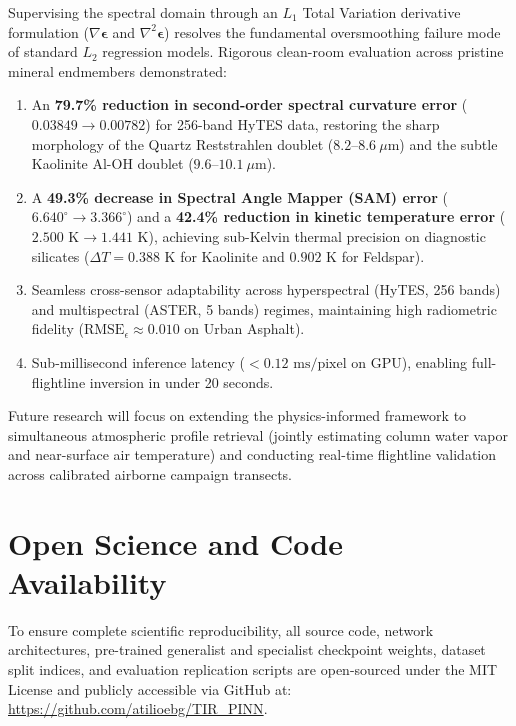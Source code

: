 \documentclass[journal]{IEEEtran}
\begin{document}
Supervising the spectral domain through an $L_1$ Total Variation derivative formulation ($\nabla \bm{\epsilon}$ and $\nabla^2 \bm{\epsilon}$) resolves the fundamental oversmoothing failure mode of standard $L_2$ regression models. Rigorous clean-room evaluation across pristine mineral endmembers demonstrated:
\begin{enumerate}
    \item An \textbf{79.7\% reduction in second-order spectral curvature error} ($0.03849 \rightarrow 0.00782$) for 256-band HyTES data, restoring the sharp morphology of the Quartz Reststrahlen doublet ($8.2\text{--}8.6\ \mu\text{m}$) and the subtle Kaolinite Al-OH doublet ($9.6\text{--}10.1\ \mu\text{m}$).
    \item A \textbf{49.3\% decrease in Spectral Angle Mapper (SAM) error} ($6.640^\circ \rightarrow 3.366^\circ$) and a \textbf{42.4\% reduction in kinetic temperature error} ($2.500\text{ K} \rightarrow 1.441\text{ K}$), achieving sub-Kelvin thermal precision on diagnostic silicates ($\Delta T = 0.388\text{ K}$ for Kaolinite and $0.902\text{ K}$ for Feldspar).
    \item Seamless cross-sensor adaptability across hyperspectral (HyTES, 256 bands) and multispectral (ASTER, 5 bands) regimes, maintaining high radiometric fidelity ($\text{RMSE}_\epsilon \approx 0.010$ on Urban Asphalt).
    \item Sub-millisecond inference latency ($< 0.12\text{ ms/pixel}$ on GPU), enabling full-flightline inversion in under 20 seconds.
\end{enumerate}

Future research will focus on extending the physics-informed framework to simultaneous atmospheric profile retrieval (jointly estimating column water vapor and near-surface air temperature) and conducting real-time flightline validation across calibrated airborne campaign transects.

\section*{Open Science and Code Availability}
To ensure complete scientific reproducibility, all source code, network architectures, pre-trained generalist and specialist checkpoint weights, dataset split indices, and evaluation replication scripts are open-sourced under the MIT License and publicly accessible via GitHub at: \url{https://github.com/atilioebg/TIR_PINN}.



\end{document}

